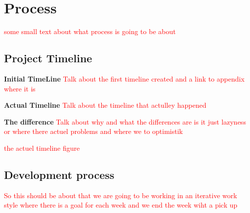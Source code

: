 \chapter{Process}\label{Process}
\textcolor{red}{some small text about what process is going to be about }

\section{Project Timeline}

\textbf{Initial TimeLine} 
\textcolor{red}{Talk about the first timeline created and a link to appendix where it is }

\textbf{Actual Timeline}
\textcolor{red}{Talk about the timeline that actulley happened}

\textbf{The difference}
\textcolor{red}{Talk about why and what the differences are is it just lazyness or where there actuel problems and where we to optimistik}

\textcolor{red}{the actuel timeline figure}
\section{Development process}
\textcolor{red}{So this should be about that we are going to be working in an iterative work style where there is a goal for each week and we end the week wiht a pick up }